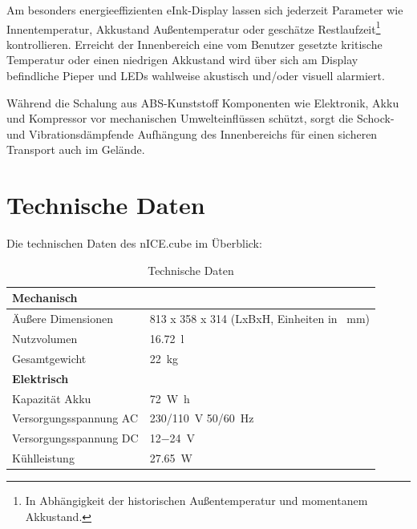 	Am besonders energieeffizienten eInk-Display lassen sich jederzeit Parameter wie Innentemperatur, Akkustand Außentemperatur oder geschätze Restlaufzeit\footnote{In Abhängigkeit der
	historischen Außentemperatur und momentanem Akkustand.} kontrollieren. Erreicht der Innenbereich eine vom Benutzer gesetzte kritische Temperatur oder einen niedrigen Akkustand
	wird über sich am Display befindliche Pieper und LEDs wahlweise akustisch und/oder visuell alarmiert.\par\smallskip

	Während die Schalung aus ABS-Kunststoff Komponenten wie Elektronik, Akku und Kompressor vor mechanischen Umwelteinflüssen schützt, sorgt die Schock- und Vibrationsdämpfende Aufhängung
	des Innenbereichs für einen sicheren Transport auch im Gelände.
	\clearpage
	\section{Technische Daten}
		Die technischen Daten des \frq nICE.cube\flq{} im Überblick:\
		\begin{table}[h]
			\centering
			\caption{Technische Daten}
			\begin{tabular}{@{}p{}p{}@{}}
				\toprule
				\textbf{Mechanisch} & \\
				\midrule
				Äußere Dimensionen & 813 x 358 x 314 (LxBxH, Einheiten in \SI{}{\milli\metre})\\
				Nutzvolumen & \SI{16,72}{\litre}\\
				Gesamtgewicht & \SI{22}{\kilo\gram}\\
				\midrule
				\textbf{Elektrisch} & \\
				\midrule
				Kapazität Akku & \SI{72}{\watt\hour}\\
				Versorgungsspannung AC & \SI{230/110}{\volt} \SI{50/60}{\hertz}\\
				Versorgungsspannung DC & \SI{12-24}{\volt}\\
				Kühlleistung & \SI{27,65}{\watt} \cite{Kompressor.datenblatt.Masterflux.20210727}\\

				\bottomrule
			\end{tabular}
			\label{tab:tech daten}
		\end{table}